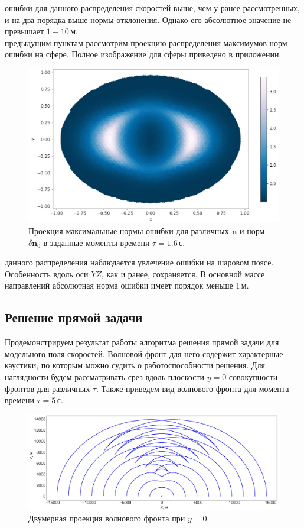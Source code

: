 \documentclass[12pt, cleqn, a4paper]{article}
\newcommand{\bfv}[1]{\mathbf{#1}}
\newcommand{\dn}{\delta \bfv{n}}
\begin{document}
 ошибки для данного распределения скоростей выше, чем у ранее рассмотренных, и на два порядка выше нормы отклонения. Однако его абсолютное значение не превышает $1-10$\,м.\\

 предыдущим пунктам рассмотрим проекцию распределения максимумов норм ошибки на сфере. Полное изображение для сферы приведено в приложении.
\begin{figure}[H] 
\centering
\includegraphics[width=1.0\linewidth]{proj_grad_gauss.eps}
\caption{Проекция максимальные нормы ошибки для различных $\bfv{n}$ и норм $\dn_0$ в заданные моменты времени $\tau = 1.6$\,с.}
\label{fig:proj_grad_gauss}
\end{figure}

 данного распределения наблюдается увлечение ошибки на шаровом поясе. Особенность вдоль оси $YZ$, как и ранее, сохраняется. В основной массе направлений абсолютная норма ошибки имеет порядок меньше 1\,м.\\

\subsection{Решение прямой задачи}
Продемонстрируем результат работы алгоритма решения прямой задачи для модельного поля скоростей. Волновой фронт для него содержит характерные каустики, по которым можно судить о работоспособности решения. Для наглядности будем рассматривать срез вдоль плоскости $y = 0$ совокупности фронтов для различных $\tau$. Также приведем вид волнового фронта для момента времени $\tau = 5$\,с.
\begin{figure}[H] 
\centering
\includegraphics[width=1.0\linewidth]{direct_problem2d.eps}
\caption{Двумерная проекция волнового фронта при $y = 0$.}
\label{fig:direct_problem2d}
\end{figure}
\end{document}
